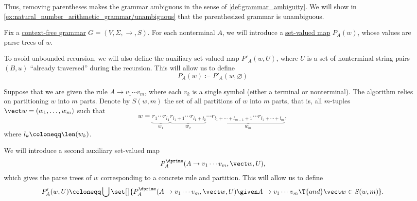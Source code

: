 \begin{example}
\begin{thmenum}
    Thus, removing parentheses makes the grammar ambiguous in the sense of \cref{def:grammar_ambiguity}. We will show in \cref{ex:natural_number_arithmetic_grammar/unambiguous} that the parenthesized grammar is unambiguous.
  \end{thmenum}
\end{example}

\begin{algorithm}\label{alg:brute_force_parsing}
  Fix a \hyperref[def:chomsky_hierarchy/context_free]{context-free grammar} \( G = (V, \Sigma, \to, S) \). For each nonterminal \( A \), we will introduce a \hyperref[def:function]{set-valued map} \( P_A(w) \), whose values are parse trees of \( w \).

  To avoid unbounded recursion, we will also define the auxiliary set-valued map \( P'_A(w, U) \), where \( U \) is a set of nonterminal-string pairs \( (B, u) \) \enquote{already traversed} during the recursion. This will allow us to define
  \begin{equation*}
    P_A(w)
    \coloneqq
    P'_A(w, \varnothing)
  \end{equation*}

  Suppose that we are given the rule \( A \to v_1 \cdots v_m \), where each \( v_k \) is a single symbol (either a terminal or nonterminal). The algorithm relies on partitioning \( w \) into \( m \) parts. Denote by \( S(w, m) \) the set of all partitions of \( w \) into \( m \) parts, that is, all \( m \)-tuples \( \vect w = (w_1, \ldots, w_m) \) such that
  \begin{equation*}
    w = \underbrace{ r_1 \cdots r_{l_1} }_{w_1} \underbrace{ r_{l_1 + 1} \cdots r_{l_1 + l_2} }_{w_2} \cdots \underbrace{ r_{l_1 + \cdots + l_{m-1} + 1} \cdots r_{l_1 + \cdots + l_m} }_{w_m},
  \end{equation*}
  where \( l_k \coloneqq \len(w_k) \).

  We will introduce a second auxiliary set-valued map
  \begin{equation*}
    P^\dprime_A(A \to v_1 \cdots v_m, \vect w, U),
  \end{equation*}
  which gives the parse trees of \( w \) corresponding to a concrete rule and partition. This will allow us to define
  \begin{equation*}
    P'_A(w, U)
    \coloneqq
    \bigcup\set[\big]{ P^\dprime_A(A \to v_1 \cdots v_m, \vect w, U) \given A \to v_1 \cdots v_m \T{and} \vect w \in S(w, m) }.
  \end{equation*}


\end{algorithm}
